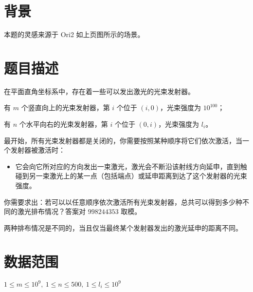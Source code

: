 \documentclass[a4paper,10pt]{article}
\begin{document}
\section*{背景}

本题的灵感来源于 Ori2 如上页图所示的场景。

\section*{题目描述}

在平面直角坐标系中，存在着一些可以发出激光的光束发射器。

有 $m$ 个竖直向上的光束发射器，第 $i$ 个位于 $(i,0)$，光束强度为 $10^{100}$；

有 $n$ 个水平向右的光束发射器，第 $i$ 个位于 $(0,i)$，光束强度为 $l_i$。

最开始，所有光束发射器都是关闭的，你需要按照某种顺序将它们依次激活，当一个发射器被激活时：

\begin{itemize}
\item 它会向它所对应的方向发出一束激光，激光会不断沿该射线方向延申，直到触碰到另一束激光上的某一点（包括端点）或延申距离到达了这个发射器的光束强度。
\end{itemize}

你需要求出：若可以以任意顺序依次激活所有光束发射器，总共可以得到多少种不同的激光排布情况？答案对 $998244353$ 取模。

两种排布情况是不同的，当且仅当最终某个发射器发出的激光延申的距离不同。

\section*{数据范围}

$1\leq m\leq 10^9,\ 1\leq n\leq 500,\ 1\leq l_i\leq 10^9$

\newpage
\end{document}
